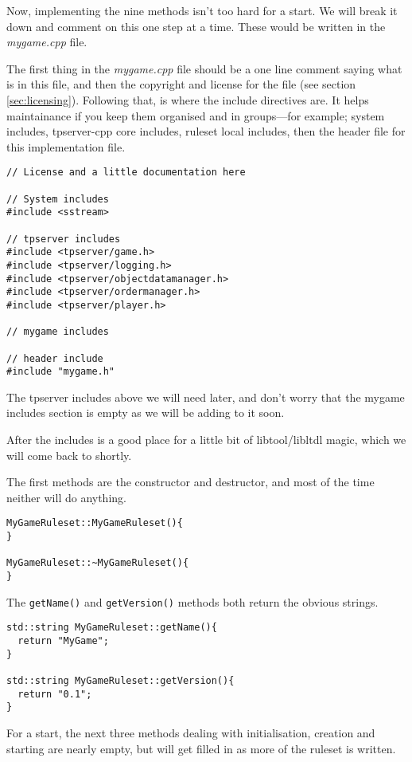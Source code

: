 \documentclass[a4paper,11pt]{report}
\newcommand{\filename}[1]{\emph{#1}}
\newcommand{\codename}[1]{\texttt{#1}}
\begin{document}
Now, implementing the nine methods isn't too hard for a start. We will break it down and comment on this one step at a time. These would be written in the \filename{mygame.cpp} file.

The first thing in the \filename{mygame.cpp} file should be a one line comment saying what is in this file, and then the copyright and license for the file (see section \ref{sec:licensing}). Following that, is where the include directives are. It helps maintainance if you keep them organised and in groups---for example; system includes, tpserver-cpp core includes, ruleset local includes, then the header file for this implementation file.

\begin{verbatim}
// License and a little documentation here

// System includes
#include <sstream>

// tpserver includes
#include <tpserver/game.h>
#include <tpserver/logging.h>
#include <tpserver/objectdatamanager.h>
#include <tpserver/ordermanager.h>
#include <tpserver/player.h>

// mygame includes

// header include
#include "mygame.h"
\end{verbatim}

The tpserver includes above we will need later, and don't worry that the mygame includes section is empty as we will be adding to it soon.

After the includes is a good place for a little bit of libtool/libltdl magic, which we will come back to shortly.

The first methods are the constructor and destructor, and most of the time neither will do anything.

\begin{verbatim}
MyGameRuleset::MyGameRuleset(){
}

MyGameRuleset::~MyGameRuleset(){
}
\end{verbatim}

The \codename{getName()} and \codename{getVersion()} methods both return the obvious strings.

\begin{verbatim}
std::string MyGameRuleset::getName(){
  return "MyGame";
}

std::string MyGameRuleset::getVersion(){
  return "0.1";
}
\end{verbatim}

For a start, the next three methods dealing with initialisation, creation and starting are nearly empty, but will get filled in as more of the ruleset is written.
\end{document}
